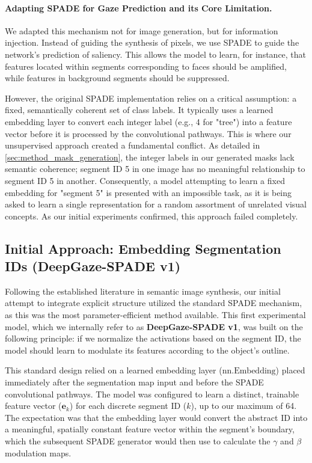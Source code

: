 \paragraph{Adapting SPADE for Gaze Prediction and its Core Limitation.}
We adapted this mechanism not for image generation, but for information injection. Instead of guiding the synthesis of pixels, we use SPADE to guide the network's prediction of saliency. This allows the model to learn, for instance, that features located within segments corresponding to faces should be amplified, while features in background segments should be suppressed.

However, the original SPADE implementation relies on a critical assumption: a fixed, semantically coherent set of class labels. It typically uses a learned embedding layer to convert each integer label (e.g., 4 for "tree") into a feature vector before it is processed by the convolutional pathways. This is where our unsupervised approach created a fundamental conflict. As detailed in \cref{sec:method_mask_generation}, the integer labels in our generated masks lack semantic coherence; segment ID 5 in one image has no meaningful relationship to segment ID 5 in another. Consequently, a model attempting to learn a fixed embedding for "segment 5" is presented with an impossible task, as it is being asked to learn a single representation for a random assortment of unrelated visual concepts. As our initial experiments confirmed, this approach failed completely.

\subsection{Initial Approach: Embedding Segmentation IDs (DeepGaze-SPADE v1)}
\label{sec:method_initial_spade_failure}

Following the established literature in semantic image synthesis, our initial attempt to integrate explicit structure utilized the standard SPADE mechanism, as this was the most parameter-efficient method available. This first experimental model, which we internally refer to as \textbf{DeepGaze-SPADE v1}, was built on the following principle: if we normalize the activations based on the segment ID, the model should learn to modulate its features according to the object's outline.

This standard design relied on a learned embedding layer ($\text{nn.Embedding}$) placed immediately after the segmentation map input and before the SPADE convolutional pathways. The model was configured to learn a distinct, trainable feature vector ($\mathbf{e}_k$) for each discrete segment ID ($k$), up to our maximum of 64. The expectation was that the embedding layer would convert the abstract ID into a meaningful, spatially constant feature vector within the segment's boundary, which the subsequent SPADE generator would then use to calculate the $\gamma$ and $\beta$ modulation maps.

